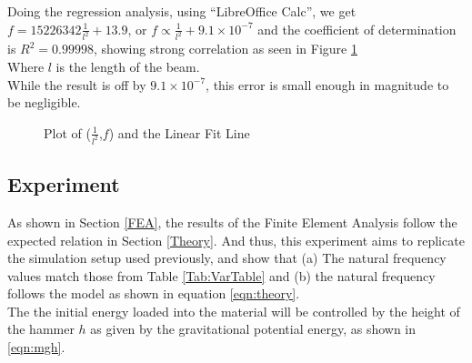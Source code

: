 \documentclass[a4paper,12pt]{article}
\begin{document}
    Doing the regression analysis, using ``LibreOffice Calc'', we get $f=15226342\frac{1}{l^{2}}+13.9$, or $f\propto\frac{1}{l^{2}}+9.1\times10^{-7}$ and the coefficient of determination is $R^{2}=0.99998$, showing strong correlation as seen in Figure \ref{fig:regression}\\
    Where $l$ is the length of the beam.\\
    While the result is off by $9.1\times10^{-7}$, this error is small enough in magnitude to be negligible.
    \begin{figure}[H]%
    \begin{center}

    \caption{Plot of ($\frac{1}{l^{2}}$,$f$) and the Linear Fit Line}\label{fig:regression}
    \end{center}
    \end{figure}


    \subsection{Experiment}\label{Experiment}%
    As shown in Section \ref{FEA}, the results of the Finite Element Analysis follow the expected relation in Section \ref{Theory}. And thus, this experiment aims to replicate the simulation setup used previously, and show that (a) The natural frequency values match those from Table \ref{Tab:VarTable} and (b) the natural frequency follows the model as shown in equation \eqref{eqn:theory}.\\
    The the initial energy loaded into the material will be controlled by the height of the hammer $h$ as given by the gravitational potential energy, as shown in \eqref{eqn:mgh}.
\end{document}
